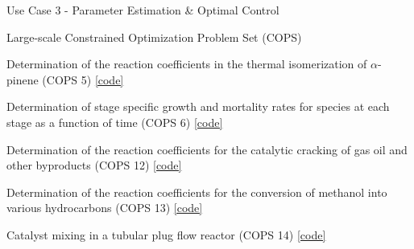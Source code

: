 \documentclass[compress,newPxFont,sthlmFooter]{beamer}
\begin{document}
\begin{frame}[plain]{Use Case 3 - Parameter Estimation \& Optimal Control}
    \begin{center}
        {\small
            \alert{Large-scale Constrained Optimization Problem Set (COPS)}
        }
    \end{center}  
    \begin{itemize}
      {\small
          \item Determination of the reaction coefficients in the thermal isomerization of $\alpha$-pinene (COPS 5)
                \href{http://daetools.com/docs/tutorials-chemeng-optimisation.html\#tutorial-che-opt-2}{[code]}
          \item Determination of stage specific growth and mortality rates for species at each stage as a function of time (COPS 6)
                \href{http://daetools.com/docs/tutorials-chemeng-optimisation.html\#tutorial-che-opt-3}{[code]}
          \item Determination of the reaction coefficients for the catalytic cracking of gas oil and other byproducts (COPS 12)
                \href{http://daetools.com/docs/tutorials-chemeng-optimisation.html\#tutorial-che-opt-4}{[code]}
          \item Determination of the reaction coefficients for the conversion of methanol into various hydrocarbons (COPS 13)
                \href{http://daetools.com/docs/tutorials-chemeng-optimisation.html\#tutorial-che-opt-5}{[code]}
          \item Catalyst mixing in a tubular plug flow reactor (COPS 14)
                \href{http://daetools.com/docs/tutorials-chemeng-optimisation.html\#tutorial-che-opt-6}{[code]}
      }
    \end{itemize}
\end{frame}
\end{document}
